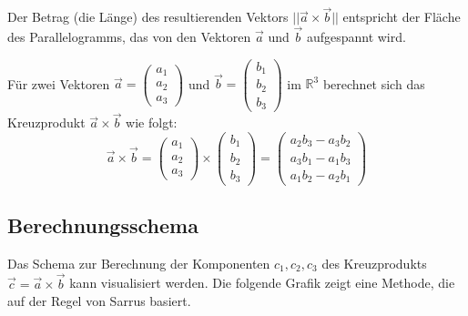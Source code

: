 Der Betrag (die Länge) des resultierenden Vektors \(||\vec{a} \times \vec{b}||\) entspricht der Fläche des Parallelogramms, das von den Vektoren \(\vec{a}\) und \(\vec{b}\) aufgespannt wird.

Für zwei Vektoren \(\vec{a} = \begin{pmatrix} a_1 \\ a_2 \\ a_3 \end{pmatrix}\) und \(\vec{b} = \begin{pmatrix} b_1 \\ b_2 \\ b_3 \end{pmatrix}\) im \(\mathbb{R}^3\) berechnet sich das Kreuzprodukt \(\vec{a} \times \vec{b}\) wie folgt:
\[ \vec{a} \times \vec{b} = \begin{pmatrix} a_1 \\ a_2 \\ a_3 \end{pmatrix} \times \begin{pmatrix} b_1 \\ b_2 \\ b_3 \end{pmatrix} = \begin{pmatrix} a_2 b_3 - a_3 b_2 \\ a_3 b_1 - a_1 b_3 \\ a_1 b_2 - a_2 b_1 \end{pmatrix} \]

\subsection{Berechnungsschema}
Das Schema zur Berechnung der Komponenten \(c_1, c_2, c_3\) des Kreuzprodukts \(\vec{c} = \vec{a} \times \vec{b}\) kann visualisiert werden. Die folgende Grafik zeigt eine Methode, die auf der Regel von Sarrus basiert.

